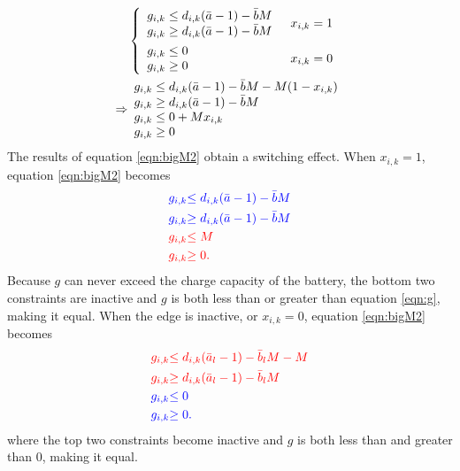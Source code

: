 \begin{equation}\label{eqn:bigM2}
 \begin{aligned} 
	 &\begin{dcases} 
		\begin{array}{l}
		g_{i,k} \le d_{i,k}(\bar{a} - 1) - \bar{b}M\\
		g_{i,k} \ge d_{i,k}(\bar{a} - 1) - \bar{b}M\\
		\end{array}
		& x_{i,k} = 1 \\
		\begin{array}{l}
		g_{i,k} \le 0 \\
		g_{i,k} \ge 0 \\
		\end{array} & x_{i,k} = 0\\ 
	\end{dcases} \\
	\Rightarrow & 
	 \begin{array}{l}
		 g_{i,k} \le d_{i,k}(\bar{a} - 1) - \bar{b}M - M(1 - x_{i,k})\\
		g_{i,k} \ge d_{i,k}(\bar{a} - 1) - \bar{b}M\\
		 g_{i,k} \le 0 + Mx_{i,k} \\
		g_{i,k} \ge 0 \\
	 \end{array}
\end{aligned}
\end{equation}
The results of equation \ref{eqn:bigM2} obtain a switching effect.  When $x_{i,k} = 1$, equation \ref{eqn:bigM2} becomes 
\begin{equation}
	\begin{aligned}
		\color{blue}{g_{i,k}}  &\color{blue}{\le d_{i,k}(\bar{a} - 1) - \bar{b}M} \\
		\color{blue}{g_{i,k}}  &\color{blue}{\ge d_{i,k}(\bar{a} - 1) - \bar{b}M} \\
		\color{red}{g_{i,k}} & \color{red}{\le M} \\
		\color{red}{g_{i,k}} & \color{red}{\ge 0}.  
	\end{aligned}
\end{equation}
Because $g$ can never exceed the charge capacity of the battery, the bottom two constraints are inactive and $g$ is both less than or greater than equation \ref{eqn:g}, making it equal.  When the edge is inactive, or $x_{i,k} = 0$, equation \ref{eqn:bigM2} becomes
\begin{equation}
	\begin{aligned}
		\color{red}{g_{i,k}}  &\color{red}{\le d_{i,k}(\bar{a}_l - 1) - \bar{b}_lM - M} \\
		\color{red}{g_{i,k}}  &\color{red}{\ge d_{i,k}(\bar{a}_l - 1) - \bar{b}_lM} \\
		\color{blue}{g_{i,k}} &\color{blue}{\le 0} \\
		\color{blue}{g_{i,k}} &\color{blue}{\ge 0}.  
	\end{aligned}
\end{equation}
where the top two constraints become inactive and $g$ is both less than and greater than 0, making it equal.

